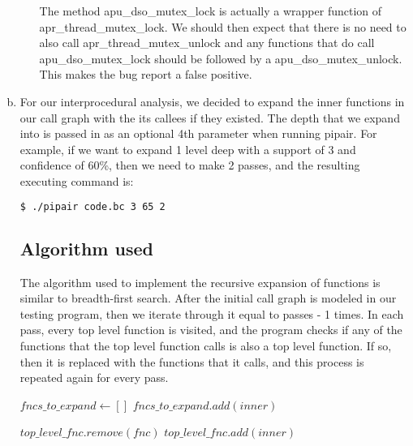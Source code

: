 \documentclass{article}
\begin{document}
\begin{enumerate}[(a)]
\begin{enumerate}
        The method apu\_dso\_mutex\_lock is actually a wrapper function of apr\_thread\_mutex\_lock. We should then expect that there is no need to also call apr\_thread\_mutex\_unlock and any functions that do call apu\_dso\_mutex\_lock should be followed by a apu\_dso\_mutex\_unlock. This makes the bug report a false positive.

      \end{enumerate}
    \item
      For our interprocedural analysis, we decided to expand the inner functions in our call graph with the its callees if they existed. The depth that we expand into is passed in as an optional 4th parameter when running pipair. For example, if we want to expand 1 level deep with a support of 3 and confidence of 60\%, then we need to make 2 passes, and the resulting executing command is:
      \begin{lstlisting}[language=bash]
        $ ./pipair code.bc 3 65 2
      \end{lstlisting}

      \subsection*{Algorithm used}
      The algorithm used to implement the recursive expansion of functions is similar to breadth-first search. After the initial call graph is modeled in our testing program, then we iterate through it equal to passes - 1 times. In each pass, every top level function is visited, and the program checks if any of the functions that the top level function calls is also a top level function. If so, then it is replaced with the functions that it calls, and this process is repeated again for every pass.

      \begin{algorithmic}[1]
            \State $fncs\_to\_expand \gets []$
                \State $fncs\_to\_expand.add(inner)$
              \EndIf
            \EndFor

              \State $top\_level\_fnc.remove(fnc)$
                \State $top\_level\_fnc.add(inner)$
              \EndFor
            \EndFor
          \EndFor
        \EndFor
      \end{algorithmic}


\end{enumerate}
\end{document}
